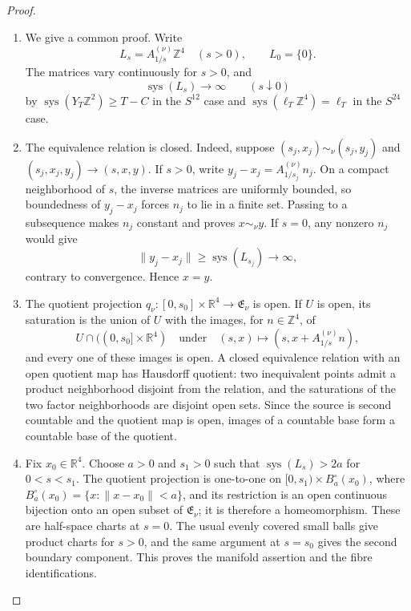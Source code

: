 \begin{proof}
\begin{enumerate}[label=\arabic*.,leftmargin=*]
\item We give a common proof.  Write
\[
 L_s=A_{1/s}^{(\nu)}\mathbb Z^4\quad(s>0),
 \qquad L_0=\{0\}.
\]
The matrices vary continuously for \(s>0\), and
\[
 \operatorname{sys}(L_s)\longrightarrow\infty
 \qquad(s\downarrow0)
\]
by \(\operatorname{sys}(Y_T\mathbb Z^2)\geq T-C\) in the
\(S^{12}\) case and \(\operatorname{sys}(\ell_T\mathbb Z^4)=\ell_T\)
in the \(S^{24}\) case.

\item The equivalence relation is closed.  Indeed, suppose
\((s_j,x_j)\sim_\nu(s_j,y_j)\) and
\((s_j,x_j,y_j)\to(s,x,y)\).  If \(s>0\), write
\(y_j-x_j=A_{1/s_j}^{(\nu)}n_j\).  On a compact neighborhood of \(s\),
the inverse matrices are uniformly bounded, so boundedness of
\(y_j-x_j\) forces \(n_j\) to lie in a finite set.  Passing to a
subsequence makes \(n_j\) constant and proves \(x\sim_\nu y\).  If
\(s=0\), any nonzero \(n_j\) would give
\[
 \|y_j-x_j\|\geq\operatorname{sys}(L_{s_j})\longrightarrow\infty,
\]
contrary to convergence.  Hence \(x=y\).

\item The quotient projection \(q_\nu:[0,s_0]\times\mathbb R^4\to
\mathfrak E_\nu\) is open.  If \(U\) is open, its saturation is the union
of \(U\) with the images, for \(n\in\mathbb Z^4\), of
\[
 U\cap((0,s_0]\times\mathbb R^4)
 \quad\text{under}\quad
 (s,x)\longmapsto(s,x+A_{1/s}^{(\nu)}n),
\]
and every one of these images is open.  A closed equivalence relation with
an open quotient map has Hausdorff quotient: two inequivalent points admit
a product neighborhood disjoint from the relation, and the saturations of
the two factor neighborhoods are disjoint open sets.  Since the source is
second countable and the quotient map is open, images of a countable base
form a countable base of the quotient.

\item Fix \(x_0\in\mathbb R^4\).  Choose \(a>0\) and \(s_1>0\) such that
\(\operatorname{sys}(L_s)>2a\) for \(0<s<s_1\).  The quotient projection
is one-to-one on
\([0,s_1)\times B_a^\circ(x_0)\), where
\(B_a^\circ(x_0)=\{x:\|x-x_0\|<a\}\), and its restriction is an open continuous
bijection onto an open subset of \(\mathfrak E_\nu\); it is therefore a
homeomorphism.  These are half-space charts at \(s=0\).  The usual evenly
covered small balls give product charts for \(s>0\), and the same argument
at \(s=s_0\) gives the second boundary component.  This proves the
manifold assertion and the fibre identifications.


\end{enumerate}
\end{proof}

